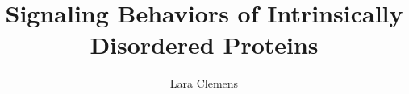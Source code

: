 \documentclass[onecolumn]{article}
\begin{document}
\title{Signaling Behaviors of Intrinsically Disordered Proteins}
\author{Lara Clemens}
\date{}

\maketitle

\newpage

\tableofcontents

\newpage



%

\graphicspath{{Background/}}



\graphicspath{{ModelDevelopment/}}



\graphicspath{{Results/LocalStructuring/}}



\graphicspath{{Results/Electrostatics/}}



\graphicspath{{Results/SimultaneousBinding/}}



\graphicspath{{Results/SurfaceEffects/}}



\graphicspath{{Timeline/}}



\graphicspath{{Appendix/}}




\printbibliography



\end{document}
